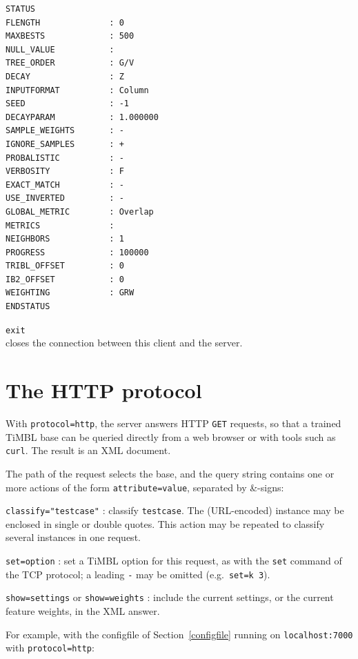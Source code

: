 \documentclass{report}
\begin{document}
\begin{description}
\begin{footnotesize}
\begin{verbatim}
STATUS
FLENGTH              : 0
MAXBESTS             : 500
NULL_VALUE           :
TREE_ORDER           : G/V
DECAY                : Z
INPUTFORMAT          : Column
SEED                 : -1
DECAYPARAM           : 1.000000
SAMPLE_WEIGHTS       : -
IGNORE_SAMPLES       : +
PROBALISTIC          : -
VERBOSITY            : F
EXACT_MATCH          : -
USE_INVERTED         : -
GLOBAL_METRIC        : Overlap
METRICS              :
NEIGHBORS            : 1
PROGRESS             : 100000
TRIBL_OFFSET         : 0
IB2_OFFSET           : 0
WEIGHTING            : GRW
ENDSTATUS
\end{verbatim}
\end{footnotesize}

\item {\tt exit}\\
  closes the connection between this client and the server.
\end{description}

\section{The HTTP protocol}
\label{httpproto}

With {\tt protocol=http}, the server answers HTTP {\tt GET} requests,
so that a trained TiMBL base can be queried directly from a web
browser or with tools such as {\tt curl}. The result is an XML
document.

The path of the request selects the base, and the query string
contains one or more actions of the form {\tt attribute=value},
separated by \&{}-signs:

\begin{description}
\item {\tt classify="testcase"} : classify {\tt testcase}. The
  (URL-encoded) instance may be enclosed in single or double quotes.
  This action may be repeated to classify several instances in one
  request.
\item {\tt set=option} : set a TiMBL option for this request, as with
  the {\tt set} command of the TCP protocol; a leading {\tt -} may be
  omitted (e.g.\ {\tt set=k 3}).
\item {\tt show=settings} or {\tt show=weights} : include the current
  settings, or the current feature weights, in the XML answer.
\end{description}

For example, with the configfile of Section~\ref{configfile} running
on {\tt localhost:7000} with {\tt protocol=http}:
\end{document}
